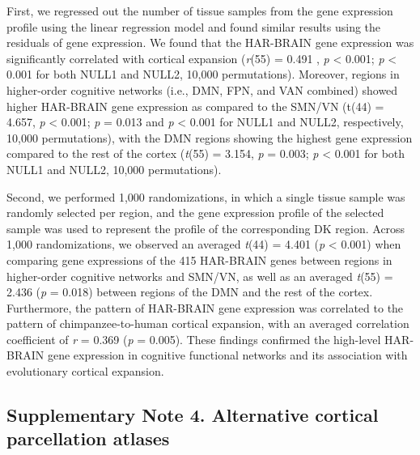 \begin{refsection}
First, we regressed out the number of tissue samples from the gene expression profile using the linear regression model and found similar results using the residuals of gene expression. We found that the HAR-BRAIN gene expression was significantly correlated with cortical expansion (\textit{r}(55) = 0.491 , \textit{p} < 0.001; \textit{p} < 0.001 for both NULL1 and NULL2, 10,000 permutations). Moreover, regions in higher-order cognitive networks (i.e., DMN, FPN, and VAN combined) showed higher HAR-BRAIN gene expression as compared to the SMN/VN (t(44) = 4.657, \textit{p} < 0.001; \textit{p} = 0.013 and \textit{p} < 0.001 for NULL1 and NULL2, respectively, 10,000 permutations), with the DMN regions showing the highest gene expression compared to the rest of the cortex (\textit{t}(55) = 3.154, \textit{p} = 0.003; \textit{p} < 0.001 for both NULL1 and NULL2, 10,000 permutations).

Second, we performed 1,000 randomizations, in which a single tissue sample was randomly selected per region, and the gene expression profile of the selected sample was used to represent the profile of the corresponding DK region. Across 1,000 randomizations, we observed an averaged \textit{t}(44) = 4.401 (\textit{p} < 0.001) when comparing gene expressions of the 415 HAR-BRAIN genes between regions in higher-order cognitive networks and SMN/VN, as well as an averaged \textit{t}(55) = 2.436 (\textit{p} = 0.018) between regions of the DMN and the rest of the cortex. Furthermore, the pattern of HAR-BRAIN gene expression was correlated to the pattern of chimpanzee-to-human cortical expansion, with an averaged correlation coefficient of \textit{r} = 0.369 (\textit{p} = 0.005). These findings confirmed the high-level HAR-BRAIN gene expression in cognitive functional networks and its association with evolutionary cortical expansion.

\subsection*{Supplementary Note 4. Alternative cortical parcellation atlases}

\end{refsection}
